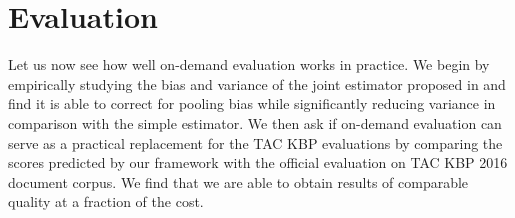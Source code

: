 \section{Evaluation}
\label{sec:evaluation}

Let us now see how well on-demand evaluation works in practice.
We begin by empirically studying the bias and variance of the joint estimator proposed in  and find it is able to correct for pooling bias while significantly reducing variance in comparison with the simple estimator.
We then ask if on-demand evaluation can serve as a practical replacement for the TAC KBP evaluations by comparing the scores predicted by our framework with the official evaluation on TAC KBP 2016 document corpus.
We find that we are able to obtain results of comparable quality at a fraction of the cost.

